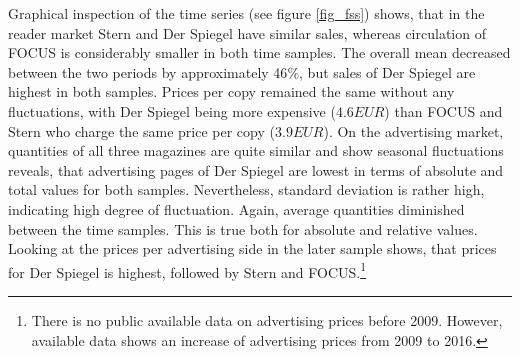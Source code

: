 \documentclass[12pt,a4paper,notitlepage]{article}
\begin{document}
Graphical inspection of the time series (see figure \ref{fig_fss}) shows, that in the reader market Stern and Der Spiegel have similar sales, whereas circulation of FOCUS is considerably smaller in both time samples. The overall mean decreased between the two periods by approximately 46$\%$, but sales of Der Spiegel are highest in both samples. Prices per copy remained the same without any fluctuations, with Der Spiegel being more expensive ($4.6 EUR$) than FOCUS and Stern who charge the same price per copy ($3.9 EUR$). On the advertising market, quantities of all three magazines are quite similar and show seasonal fluctuations reveals, that advertising pages of Der Spiegel are lowest in terms of absolute and total values for both samples. Nevertheless, standard deviation is rather high, indicating high degree of fluctuation. Again, average quantities diminished between the time samples. This is true both for absolute and relative values. Looking at the prices per advertising side in the later sample shows, that prices for Der Spiegel is highest, followed by Stern and FOCUS.\footnote{There is no public available data on advertising prices before 2009. However, available data shows an increase of advertising prices from 2009 to 2016.}
\end{document}

